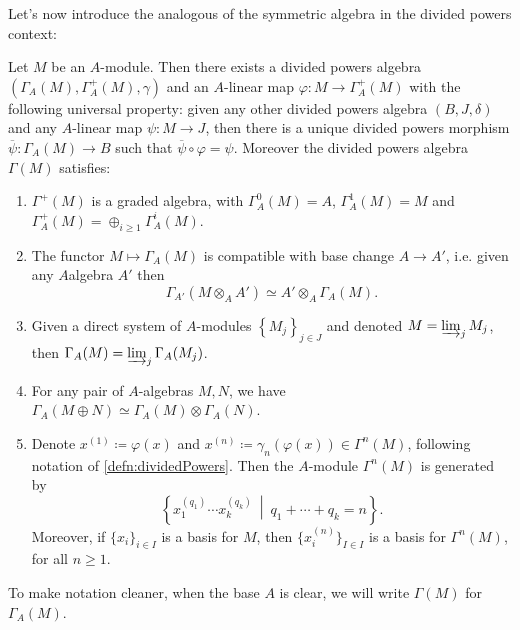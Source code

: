 \documentclass[../Main]{subfiles}
\begin{document}
\noindent
Let's now introduce the analogous of the symmetric algebra 
in the divided powers context:
\begin{thm}
	Let $M$ be an $A$-module.
	Then there exists a divided powers algebra 
	$\left(\Gamma_A(M), \Gamma_A^+(M), \gamma\right)$ and an $A$-linear
	map $\varphi\colon M \to \Gamma_A^+(M)$ with the following
	universal property:
	given any other divided powers algebra
	$\left(B, J, \delta\right)$ and any $A$-linear
	map $\psi\colon M \to J$,
	then there is a unique divided powers morphism
	$\overline{\psi}\colon \Gamma_A(M) \to B$
	such that $\overline{\psi} \circ \varphi = \psi$.
	Moreover the divided powers algebra $\Gamma(M)$ satisfies:
\begin{enumerate}
	\item $\Gamma^+(M)$ is a graded algebra, with
		$\Gamma_A^0(M) = A$, $\Gamma_A^1(M) = M$
		and $\Gamma_A^+(M) = \oplus_{i \geq 1} \Gamma_A^i(M)$.

	\item The functor $M \mapsto \Gamma_A(M)$ is compatible with
		base change $A \to A'$, i.e. given any $A$algebra $A'$
		then
		\begin{equation*}
			\Gamma_{A'}(M \otimes_A A') \simeq A' \otimes_A \Gamma_A(M)
		.\end{equation*}

	\item Given a direct system of $A$-modules $\left\{ M_j \right\}_{j \in J}$ 
		and denoted $M = \varinjlim_j M_j$, then $\Gamma_A(M) = \varinjlim_{j} \Gamma_A(M_j)$.

	\item For any pair of $A$-algebras $M, N$, we have $\Gamma_A(M \oplus N)
		\simeq \Gamma_A(M) \otimes \Gamma_A(N)$.

	\item Denote $x^{(1)} \coloneqq \varphi(x)$ and $x^{(n)} \coloneqq \gamma_n(\varphi(x)) \in
		\Gamma^n(M)$, following notation of \cref{defn:dividedPowers}.
		Then the $A$-module $\Gamma^n(M)$ is generated by
		\begin{equation*}
		\left\{ x_1^{(q_1)} \cdots x_k^{(q_k)} \ \middle|\ 
		q_1 + \cdots + q_k = n \right\}
		.\end{equation*}
		Moreover, if $\{ x_i \}_{i \in I}$ is a basis
		for $M$, then $\{ x^{(n)}_i \}_{I \in I}$
		is a basis for $\Gamma^n(M)$,
		for all $n \geq 1$.
\end{enumerate}
	To make notation cleaner, when the base $A$ is clear, we
	will write $\Gamma(M)$ for $\Gamma_A(M)$.
\end{thm}
\end{document}

